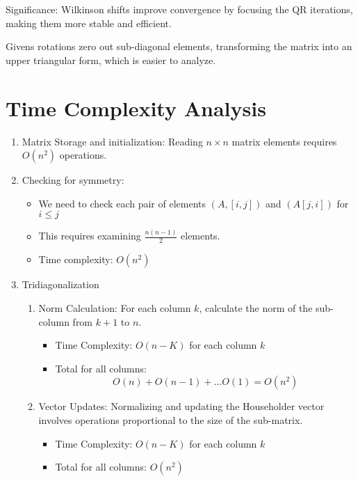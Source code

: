 \documentclass{article}
\theoremstyle{remark}
\begin{document}
Significance: Wilkinson shifts improve convergence by focusing the QR iterations, making them more stable and efficient.

Givens rotations zero out sub-diagonal elements, transforming the matrix into an upper triangular form, which is easier to analyze.

\section{Time Complexity Analysis}

\begin{enumerate}
    \item Matrix Storage and initialization: Reading $n \times n$ matrix elements requires $O(n^2)$ operations.
    
    \item Checking for symmetry: 
            \begin{itemize}
                \item We need to check each pair of elements $(A,[i,j])$ and $(A[j,i])$ for $i \leq j$
                \item This requires examining $\frac{n(n-1)}{2}$ elements.
                \item Time complexity: $O(n^2)$
            \end{itemize}

    \item Tridiagonalization
        \begin{enumerate}
            \item Norm Calculation: For each column $k$, calculate the norm of the sub-column from $k+1$ to $n$.
                \begin{itemize}
                    \item Time Complexity: $O(n-K)$ for each column $k$
                    \item Total for all columns: $$O(n)+O(n-1)+ \ldots O(1) =O(n^2)$$
                \end{itemize}

           
            \item Vector Updates: Normalizing and updating the Householder vector involves operations proportional to the size of the sub-matrix.  
            \begin{itemize}
                    \item Time Complexity: $O(n-K)$ for each column $k$
                    \item Total for all columns: $O(n^2)$
                \end{itemize}


\end{enumerate}
\end{enumerate}
\end{document}
